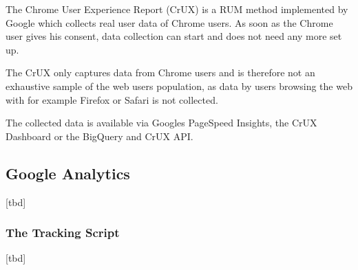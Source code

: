 The Chrome User Experience Report (CrUX) is a RUM method implemented by Google which collects real user data of Chrome users.
As soon as the Chrome user gives his consent, data collection can start and does not need any more set up.

The CrUX only captures data from Chrome users and is therefore not an exhaustive sample of the web users population, as data by users browsing the web with for example Firefox or Safari is not collected.

The collected data is available via Googles PageSpeed Insights, the CrUX Dashboard or the BigQuery and CrUX API. %







\subsection{Google Analytics}

[tbd]





\subsubsection{The Tracking Script}

[tbd]








